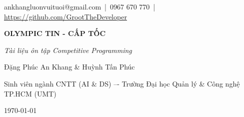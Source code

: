 \begin{titlepage}
\thispagestyle{empty}
\centering

\vspace*{1cm}

{\large ankhangluonvuituoi@gmail.com \,|\, 0967 670 770 \,|\, \url{https://github.com/GrootTheDeveloper}}\\[3.5cm]

{\fontsize{36}{40}\selectfont\bfseries OLYMPIC TIN - CẤP TỐC\par} 
\vspace{0.6cm}
{\fontsize{18}{22}\selectfont\itshape Tài liệu ôn tập Competitive Programming \par}
\vspace{5cm}

{\Large Đặng Phúc An Khang \& Huỳnh Tấn Phúc\par}
\vspace{0.4cm}
{\large Sinh viên ngành CNTT (AI \& DS) –- Trường Đại học Quản lý \& Công nghệ TP.HCM (UMT)\par}
\vspace{1.2cm}

\vspace{10cm}

{\Large \today\par}

\vfill
\end{titlepage}
